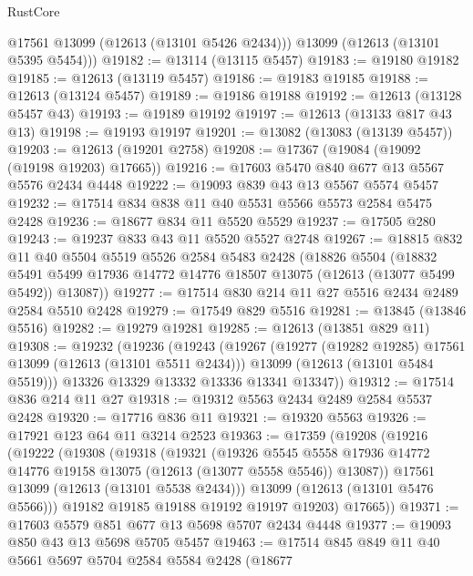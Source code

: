 \begin{lexlean}{RustCore}
\begin{coremodule}
        @17561
        @13099
        (@12613 (@13101 @5426 @2434)))
      @13099
      (@12613 (@13101 @5395 @5454)))
@19182 := @13114 (@13115 @5457)
@19183 := @19180 @19182
@19185 := @12613 (@13119 @5457)
@19186 := @19183 @19185
@19188 := @12613 (@13124 @5457)
@19189 := @19186 @19188
@19192 := @12613 (@13128 @5457 @43)
@19193 := @19189 @19192
@19197 := @12613 (@13133 @817 @43 @13)
@19198 := @19193 @19197
@19201 := @13082 (@13083 (@13139 @5457))
@19203 := @12613 (@19201 @2758)
@19208 := @17367 (@19084 (@19092 (@19198 @19203) @17665))
@19216 := @17603 @5470 @840 @677 @13 @5567 @5576 @2434 @4448
@19222 := @19093 @839 @43 @13 @5567 @5574 @5457
@19232 := @17514 @834 @838 @11 @40 @5531 @5566 @5573 @2584 @5475 @2428
@19236 := @18677 @834 @11 @5520 @5529
@19237 := @17505 @280
@19243 := @19237 @833 @43 @11 @5520 @5527 @2748
@19267 := @18815
    @832
    @11
    @40
    @5504
    @5519
    @5526
    @2584
    @5483
    @2428
    (@18826
      @5504
      (@18832 @5491 @5499 @17936 @14772 @14776 @18507 @13075 (@12613 (@13077 @5499 @5492)) @13087))
@19277 := @17514 @830 @214 @11 @27 @5516 @2434 @2489 @2584 @5510 @2428
@19279 := @17549 @829 @5516
@19281 := @13845 (@13846 @5516)
@19282 := @19279 @19281
@19285 := @12613 (@13851 @829 @11)
@19308 := @19232
    (@19236
      (@19243
        (@19267
          (@19277 (@19282 @19285) @17561 @13099 (@12613 (@13101 @5511 @2434)))
          @13099
          (@12613 (@13101 @5484 @5519)))
        @13326
        @13329
        @13332
        @13336
        @13341
        @13347))
@19312 := @17514 @836 @214 @11 @27
@19318 := @19312 @5563 @2434 @2489 @2584 @5537 @2428
@19320 := @17716 @836 @11
@19321 := @19320 @5563
@19326 := @17921 @123 @64 @11 @3214 @2523
@19363 := @17359
    (@19208
      (@19216
        (@19222
          (@19308
            (@19318
              (@19321
                (@19326
                  @5545
                  @5558
                  @17936
                  @14772
                  @14776
                  @19158
                  @13075
                  (@12613 (@13077 @5558 @5546))
                  @13087))
              @17561
              @13099
              (@12613 (@13101 @5538 @2434)))
            @13099
            (@12613 (@13101 @5476 @5566)))
          @19182
          @19185
          @19188
          @19192
          @19197
          @19203)
        @17665))
@19371 := @17603 @5579 @851 @677 @13 @5698 @5707 @2434 @4448
@19377 := @19093 @850 @43 @13 @5698 @5705 @5457
@19463 := @17514
    @845
    @849
    @11
    @40
    @5661
    @5697
    @5704
    @2584
    @5584
    @2428
    (@18677

\end{coremodule}
\end{lexlean}
